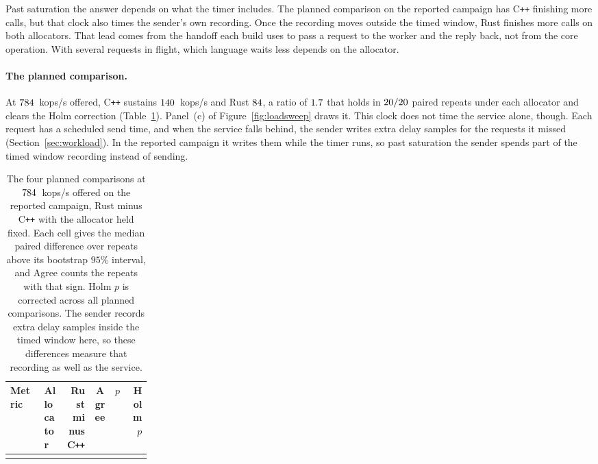 \documentclass[english,oneside,a4paper,censored,csm,software-track-2020]{HYthesisML}
\begin{document}
Past saturation the answer depends on what the timer includes. The planned
comparison on the reported campaign has C\texttt{++} finishing more calls, but
that clock also times the sender's own recording. Once the recording moves
outside the timed window, Rust finishes more calls on both allocators. That lead
comes from the handoff each build uses to pass a request to the worker and the
reply back, not from the core operation. With several requests in flight, which
language waits less depends on the allocator.

\paragraph{The planned comparison.}
At $784$~kops/s offered, C\texttt{++} sustains $140$~kops/s
and Rust $84$, a ratio of $1.7$ that holds in
$20/20$ paired repeats under each allocator and clears the Holm
correction (Table~\ref{tab:overloadtest}). Panel~(c) of
Figure~\ref{fig:loadsweep} draws it. This clock does not time the service alone,
though. Each request has a scheduled send time, and when the service falls
behind, the sender writes extra delay samples for the requests it missed
(Section~\ref{sec:workload}). In the reported campaign it writes them while the
timer runs, so past saturation the sender spends part of the timed window
recording instead of sending.

\begin{table}[!ht]
\centering
\small
\caption[The four planned comparisons past saturation]{The four planned
comparisons at $784$~kops/s offered on the reported campaign, Rust
minus C\texttt{++} with the allocator held fixed. Each cell gives the median
paired difference over \NRepeats{} repeats above its bootstrap $95\%$ interval,
and Agree counts the repeats with that sign. Holm $p$ is corrected across all
\NTests{} planned comparisons. The sender records extra delay samples inside
the timed window here, so these differences measure that recording as well as
the service.\label{tab:overloadtest}}
\setlength{\tabcolsep}{4pt}
\begin{tabular}{@{}p{0.24\linewidth} l r c r r@{}}
\hline\hline
Metric & Allocator & Rust minus C\texttt{++} & Agree & $p$ & Holm $p$ \\
\hline
\\
\hline
\end{tabular}
\end{table}
\end{document}
